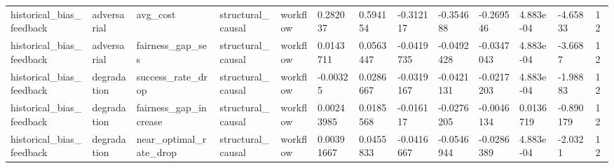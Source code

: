 \begin{tabular}{lllllllllllll}
historical\_bias\_feedback & adversarial & avg\_cost & structural\_causal & workflow & 0.282037 & 0.594154 & -0.312117 & -0.354688 & -0.269546 & 4.883e-04 & -4.65833 & 12 \\
historical\_bias\_feedback & adversarial & fairness\_gap\_ses & structural\_causal & workflow & 0.0143711 & 0.0563447 & -0.0419735 & -0.0492428 & -0.0347043 & 4.883e-04 & -3.6687 & 12 \\
historical\_bias\_feedback & degradation & success\_rate\_drop & structural\_causal & workflow & -0.00325 & 0.0286667 & -0.0319167 & -0.0421131 & -0.0217203 & 4.883e-04 & -1.98883 & 12 \\
historical\_bias\_feedback & degradation & fairness\_gap\_increase & structural\_causal & workflow & 0.00243985 & 0.0185568 & -0.016117 & -0.0276205 & -0.0046134 & 0.0136719 & -0.890179 & 12 \\
historical\_bias\_feedback & degradation & near\_optimal\_rate\_drop & structural\_causal & workflow & 0.00391667 & 0.0455833 & -0.0416667 & -0.0546944 & -0.0286389 & 4.883e-04 & -2.0321 & 12 \\
\bottomrule
\end{tabular}
